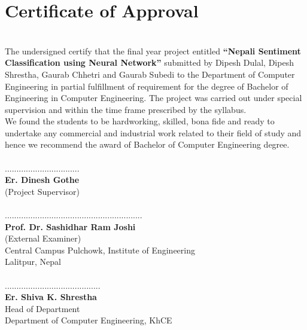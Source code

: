 
		\large
			\chapter*{Certificate of Approval}
		\normalsize
			\justify \\
The undersigned certify that the final year project entitled \textbf{“Nepali Sentiment
Classification using Neural Network”} submitted by Dipesh Dulal, Dipesh Shrestha,
Gaurab Chhetri and Gaurab Subedi to the Department of Computer Engineering in partial fulfillment of requirement for
the degree of Bachelor of Engineering in Computer Engineering. The project was
carried out under special supervision and within the time frame prescribed by the
syllabus.
\\
We found the students to be hardworking, skilled, bona fide and ready to undertake any
commercial and industrial work related to their field of study and hence we recommend
the award of Bachelor of Computer Engineering degree.\\
\vspace{1.5cm}
\\
................................\\
\textbf{Er. Dinesh Gothe}\\
(Project Supervisor)\\
\vspace{1.5cm}
\\
...........................................................\\
\textbf{Prof. Dr. Sashidhar Ram Joshi}\\
(External Examiner)\\
Central Campus Pulchowk, Institute of Engineering\\
Lalitpur, Nepal\\
\vspace{1.5cm}\\
.........................................\\
\textbf{Er. Shiva K. Shrestha}\\
Head of Department\\
Department of Computer Engineering, KhCE\\
        \break



		\large

